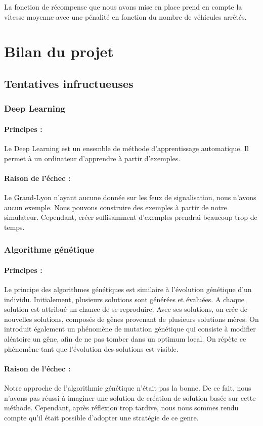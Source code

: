 \documentclass[11pt]{article}
\begin{document}
La fonction de récompense que nous avons mise en place prend en compte la vitesse moyenne avec une pénalité en fonction du nombre de véhicules arrêtés. 

\section{Bilan du projet}
\subsection{Tentatives infructueuses}
\subsubsection{Deep Learning}
\paragraph{Principes :}{
Le Deep Learning est un ensemble de méthode d'apprentissage automatique. Il permet à un ordinateur d'apprendre à partir d'exemples.
}
\paragraph{Raison de l'échec :}{
Le Grand-Lyon n'ayant aucune donnée sur les feux de signalisation, nous n'avons aucun exemple. Nous pouvons construire des exemples à partir de notre simulateur. Cependant, créer suffisamment d'exemples prendrai beaucoup trop de temps. 
}

\subsubsection{Algorithme génétique}
\paragraph{Principes :}{
Le principe des algorithmes génétiques est similaire à l'évolution génétique d'un individu. Initialement, plusieurs solutions sont générées et évaluées. A chaque solution est attribué un chance de se reproduire. Avec ses solutions, on crée de nouvelles solutions, composés de gênes provenant de plusieurs solutions mères. On introduit également un phénomène de mutation génétique qui consiste à modifier aléatoire un gêne, afin de ne pas tomber dans un optimum local.
On répète ce phénomène tant que l'évolution des solutions est visible. 
}
\paragraph{Raison de l'échec :}{
Notre approche de l'algorithmie génétique n'était pas la bonne. De ce fait, nous n'avons pas réussi à imaginer une solution de création de solution basée sur cette méthode. Cependant, après réflexion trop tardive, nous nous sommes rendu compte qu'il était possible d'adopter une stratégie de ce genre.
}

\end{document}
